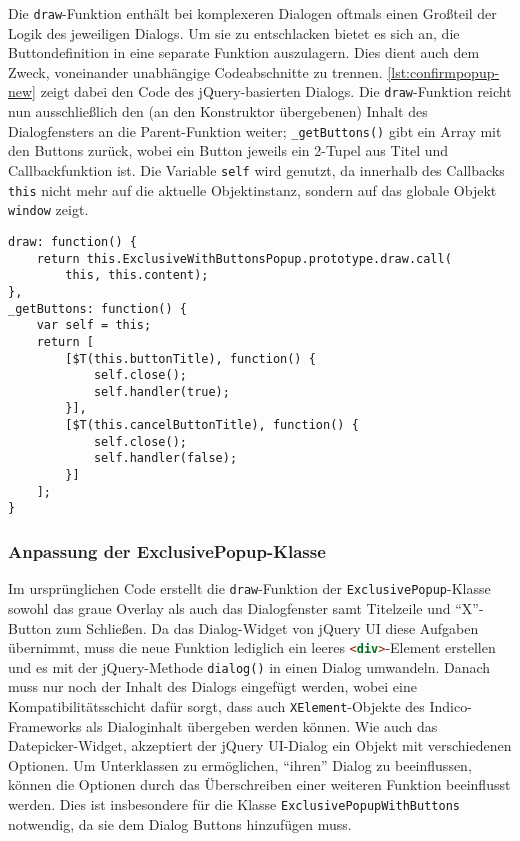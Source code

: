 Die \lstinline{draw}-Funktion enthält bei komplexeren Dialogen oftmals einen Großteil der Logik des
jeweiligen Dialogs. Um sie zu entschlacken bietet es sich an, die Buttondefinition in eine separate
Funktion auszulagern. Dies dient auch dem Zweck, voneinander unabhängige Codeabschnitte zu trennen.
\autoref{lst:confirmpopup-new} zeigt dabei den Code des jQuery-basierten Dialogs. Die
\lstinline{draw}-Funktion reicht nun ausschließlich den (an den Konstruktor übergebenen) Inhalt des
Dialogfensters an die Parent-Funktion weiter; \lstinline{_getButtons()} gibt ein Array mit den
Buttons zurück, wobei ein Button jeweils ein 2-Tupel aus Titel und Callbackfunktion ist. Die Variable
\lstinline{self} wird genutzt, da innerhalb des Callbacks \lstinline{this} nicht mehr auf die
aktuelle Objektinstanz, sondern auf das globale Objekt \lstinline{window} zeigt.


\begin{lstlisting}[label=lst:confirmpopup-new,caption=jQuery-Code zum Erstellen eines einfachen Dialogfensters]
draw: function() {
    return this.ExclusiveWithButtonsPopup.prototype.draw.call(
        this, this.content);
},
_getButtons: function() {
    var self = this;
    return [
        [$T(this.buttonTitle), function() {
            self.close();
            self.handler(true);
        }],
        [$T(this.cancelButtonTitle), function() {
            self.close();
            self.handler(false);
        }]
    ];
}
\end{lstlisting}

\subsubsection{Anpassung der ExclusivePopup-Klasse}

Im ursprünglichen Code erstellt die \lstinline{draw}-Funktion der \lstinline{ExclusivePopup}-Klasse
sowohl das graue Overlay als auch das Dialogfenster samt Titelzeile und \enquote{X}-Button zum
Schließen. Da das Dialog-Widget von jQuery UI diese Aufgaben übernimmt, muss die neue Funktion
lediglich ein leeres \lstinline[language=HTML]{<div>}-Element erstellen und es mit der
jQuery-Methode \lstinline{dialog()} in einen Dialog umwandeln. Danach muss nur noch der Inhalt des
Dialogs eingefügt werden, wobei eine Kompatibilitätsschicht dafür sorgt, dass auch
\lstinline{XElement}-Objekte des Indico-Frameworks als Dialoginhalt übergeben werden können. Wie
auch das Datepicker-Widget, akzeptiert der jQuery UI-Dialog ein Objekt mit verschiedenen Optionen. Um
Unterklassen zu ermöglichen, \enquote{ihren} Dialog zu beeinflussen, können die Optionen durch das
Überschreiben einer weiteren Funktion beeinflusst werden. Dies ist insbesondere für die Klasse
\lstinline{ExclusivePopupWithButtons} notwendig, da sie dem Dialog Buttons hinzufügen muss.

